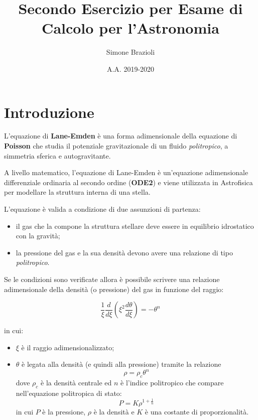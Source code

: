 \documentclass{article}
\begin{document}
\author{Simone Brazioli}
\title{Secondo Esercizio per Esame di Calcolo per l'Astronomia}
\date{A.A. 2019-2020}



\section{Introduzione}
L'equazione di \textbf{Lane-Emden} è una forma adimensionale della equazione di \textbf{Poisson} che studia il potenziale gravitazionale di un fluido \emph{politropico}, a simmetria sferica e autogravitante.

A livello matematico, l'equazione di Lane-Emden è un'equazione adimensionale differenziale ordinaria al secondo ordine (\textbf{ODE2}) e viene utilizzata in Astrofisica per modellare la struttura interna di una stella. 

L'equazione è valida a condizione di due assunzioni di partenza:

\begin{itemize}
\item il gas che la compone la struttura stellare deve essere in equilibrio idrostatico con la gravità;
\item la pressione del gas e la sua densità devono avere una relazione di tipo \emph{politropico}.
\end{itemize}

Se le condizioni sono verificate allora è possibile scrivere una relazione adimensionale della densità (o pressione) del gas in funzione del raggio:

\begin{equation}\label{eqn:LEE}
 \frac{1}{\xi}\frac{d}{d\xi}\left ( \xi^2\frac{d\theta}{d\xi} \right ) = -\theta^n
\end{equation}

in cui:
\begin{itemize}
 \item $\xi$ è il raggio adimensionalizzato;
 \item $\theta$ è legata alla densità (e quindi alla pressione) tramite la relazione $$\rho = \rho_c \theta^n$$ dove $\rho_c$ è la densità centrale ed $n$ è l'indice politropico che compare nell'equazione politropica di stato:
 \begin{equation}
  P = K\rho^{1+\frac{1}{n}}
 \end{equation}
 in cui $P$ è la pressione, $\rho$ è la densità e $K$ è una costante di proporzionalità.
\end{itemize}
\end{document}
